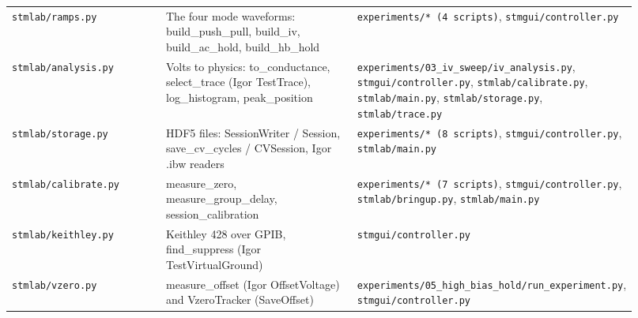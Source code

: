 \begin{longtable}{@{}>{\raggedright\arraybackslash}p{0.230\linewidth}>{\raggedright\arraybackslash}p{0.058\linewidth}>{\raggedright\arraybackslash}p{0.403\linewidth}>{\raggedright\arraybackslash}p{0.230\linewidth}@{}}
\texttt{stmlab/\discretionary{}{}{}ramps.\discretionary{}{}{}py} & 370 & The four mode waveforms: build\_push\_pull, build\_iv, build\_ac\_hold, build\_hb\_hold & \texttt{experiments/\discretionary{}{}{}* (4 scripts)}, \texttt{stmgui/\discretionary{}{}{}controller.\discretionary{}{}{}py} \\
\texttt{stmlab/\discretionary{}{}{}analysis.\discretionary{}{}{}py} & 363 & Volts to physics: to\_conductance, select\_trace (Igor TestTrace), log\_histogram, peak\_position & \texttt{experiments/\discretionary{}{}{}03\_\discretionary{}{}{}iv\_\discretionary{}{}{}sweep/\discretionary{}{}{}iv\_\discretionary{}{}{}analysis.\discretionary{}{}{}py}, \texttt{stmgui/\discretionary{}{}{}controller.\discretionary{}{}{}py}, \texttt{stmlab/\discretionary{}{}{}calibrate.\discretionary{}{}{}py}, \texttt{stmlab/\discretionary{}{}{}main.\discretionary{}{}{}py}, \texttt{stmlab/\discretionary{}{}{}storage.\discretionary{}{}{}py}, \texttt{stmlab/\discretionary{}{}{}trace.\discretionary{}{}{}py} \\
\texttt{stmlab/\discretionary{}{}{}storage.\discretionary{}{}{}py} & 346 & HDF5 files: SessionWriter / Session, save\_cv\_cycles / CVSession, Igor .ibw readers & \texttt{experiments/\discretionary{}{}{}* (8 scripts)}, \texttt{stmgui/\discretionary{}{}{}controller.\discretionary{}{}{}py}, \texttt{stmlab/\discretionary{}{}{}main.\discretionary{}{}{}py} \\
\texttt{stmlab/\discretionary{}{}{}calibrate.\discretionary{}{}{}py} & 159 & measure\_zero, measure\_group\_delay, session\_calibration & \texttt{experiments/\discretionary{}{}{}* (7 scripts)}, \texttt{stmgui/\discretionary{}{}{}controller.\discretionary{}{}{}py}, \texttt{stmlab/\discretionary{}{}{}bringup.\discretionary{}{}{}py}, \texttt{stmlab/\discretionary{}{}{}main.\discretionary{}{}{}py} \\
\texttt{stmlab/\discretionary{}{}{}keithley.\discretionary{}{}{}py} & 233 & Keithley 428 over GPIB, find\_suppress (Igor TestVirtualGround) & \texttt{stmgui/\discretionary{}{}{}controller.\discretionary{}{}{}py} \\
\texttt{stmlab/\discretionary{}{}{}vzero.\discretionary{}{}{}py} & 149 & measure\_offset (Igor OffsetVoltage) and VzeroTracker (SaveOffset) & \texttt{experiments/\discretionary{}{}{}05\_\discretionary{}{}{}high\_\discretionary{}{}{}bias\_\discretionary{}{}{}hold/\discretionary{}{}{}run\_\discretionary{}{}{}experiment.\discretionary{}{}{}py}, \texttt{stmgui/\discretionary{}{}{}controller.\discretionary{}{}{}py} \\

\end{longtable}

